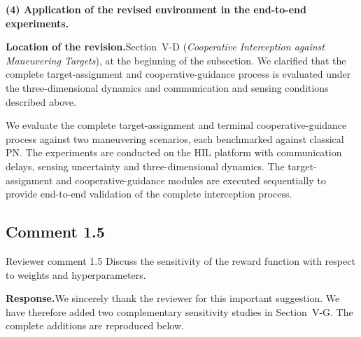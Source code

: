 \documentclass[11pt]{article}
\newcommand{\hladd}[1]{{\color{addblue}#1}}
\newcommand{\rsp}{\medskip\noindent\textbf{Response.}\quad}
\newcommand{\loc}{\medskip\noindent\textbf{Location of the revision.}\quad}
\begin{document}
\medskip
\noindent\textbf{(4) Application of the revised environment in the
end-to-end experiments.}

\loc Section~V-D (\emph{Cooperative Interception against Maneuvering
Targets}), at the beginning of the subsection. We clarified that the complete
target-assignment and cooperative-guidance process is evaluated under the
three-dimensional dynamics and communication and sensing conditions described
above.

\begin{tcolorbox}[enhanced,breakable,colback=white,colframe=addblue!55,
boxrule=0.6pt,arc=2pt,left=9pt,right=9pt,top=7pt,bottom=7pt]
\hladd{We evaluate the complete target-assignment and terminal cooperative-guidance process}
against two maneuvering scenarios, each benchmarked against classical PN.
\hladd{The experiments are conducted on the HIL platform with communication delays, sensing
uncertainty and three-dimensional dynamics. The target-assignment and cooperative-guidance
modules are executed sequentially to provide end-to-end validation of the complete interception
process.}
\end{tcolorbox}




\subsection*{Comment 1.5}

\begin{reviewercomment}{Reviewer comment 1.5}
Discuss the sensitivity of the reward function with respect to weights and
hyperparameters.
\end{reviewercomment}

\rsp We sincerely thank the reviewer for this important suggestion. We have therefore added two complementary sensitivity studies in
Section~V-G. The complete additions are reproduced below.

\end{document}
